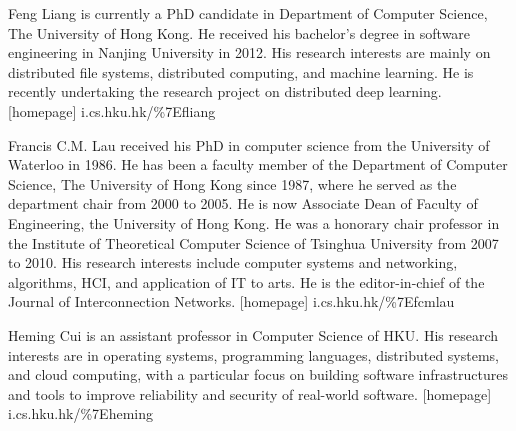 \documentclass[10pt,journal,compsoc]{IEEEtran}
\begin{document}
\vspace{-.5in}
\begin{IEEEbiography}{Feng Liang}
is currently a PhD candidate in Department of Computer Science, The University of Hong Kong. He received his bachelor's degree in software engineering in Nanjing University in 2012. His research interests are mainly on distributed file systems, distributed computing, and machine learning. He is recently undertaking the research project on distributed deep learning.
[homepage] i.cs.hku.hk/\%7Efliang
\end{IEEEbiography}

\vspace{-.5in}
\begin{IEEEbiography}{Francis C.M. Lau}
received his PhD in computer science from the University of Waterloo in 1986. He has been a faculty member of the Department of Computer Science, The University of Hong Kong since 1987, where he served as the department chair from 2000 to 2005. He is now Associate Dean of Faculty of Engineering, the University of Hong Kong. He was a honorary chair professor in the Institute of Theoretical Computer Science of Tsinghua University from 2007 to 2010. His research interests include
computer systems and networking, algorithms, HCI, and application of IT to arts. He is the editor-in-chief of the Journal of Interconnection Networks.
[homepage] i.cs.hku.hk/\%7Efcmlau
\end{IEEEbiography}

\vspace{-.5in}
\begin{IEEEbiography}{Heming Cui}
is an assistant professor in Computer Science of HKU. His research interests are in operating systems, programming languages, distributed systems, and cloud computing, with a particular focus on building software infrastructures and tools to improve reliability and security of real-world software. 
[homepage] i.cs.hku.hk/\%7Eheming
\end{IEEEbiography}
\end{document}
